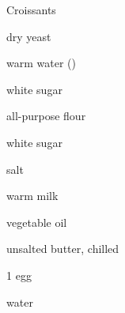 \begin{recipe}{Croissants \UNTESTED }{}{}

\begin{ingredients}
\item \tp{1\quarter} dry yeast
\item {} warm water ()
\item {} white sugar
\item \C{1\threequarter} all-purpose flour
\item {} white sugar
\item \tp{1\half} salt
\item \C{\twothird} warm milk
\item {} vegetable oil
\item \C{\twothird} unsalted butter, chilled
\item 1 egg
\item {} water
\end{ingredients}


\end{recipe}
